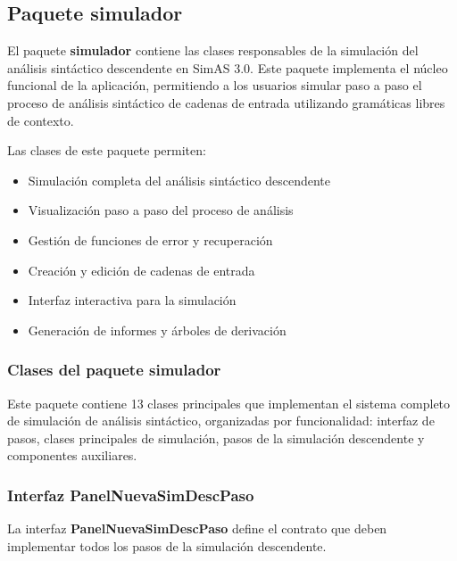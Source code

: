 \subsection{Paquete simulador}

El paquete \textbf{simulador} contiene las clases responsables de la simulación del análisis sintáctico descendente en SimAS 3.0. Este paquete implementa el núcleo funcional de la aplicación, permitiendo a los usuarios simular paso a paso el proceso de análisis sintáctico de cadenas de entrada utilizando gramáticas libres de contexto.

Las clases de este paquete permiten:
\begin{itemize}
    \item Simulación completa del análisis sintáctico descendente
    \item Visualización paso a paso del proceso de análisis
    \item Gestión de funciones de error y recuperación
    \item Creación y edición de cadenas de entrada
    \item Interfaz interactiva para la simulación
    \item Generación de informes y árboles de derivación
\end{itemize}

\subsubsection{Clases del paquete simulador}

Este paquete contiene 13 clases principales que implementan el sistema completo de simulación de análisis sintáctico, organizadas por funcionalidad: interfaz de pasos, clases principales de simulación, pasos de la simulación descendente y componentes auxiliares.

\subsubsection{Interfaz PanelNuevaSimDescPaso}

La interfaz \textbf{PanelNuevaSimDescPaso} define el contrato que deben implementar todos los pasos de la simulación descendente.

